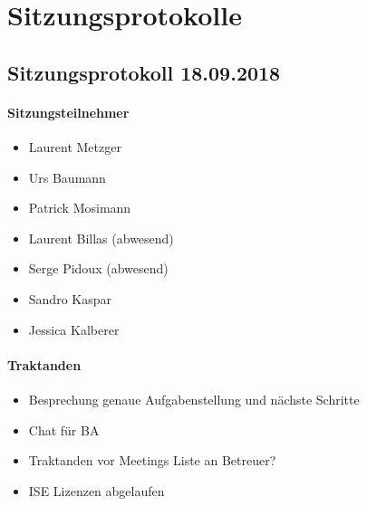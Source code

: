 \section{Sitzungsprotokolle}

\subsection{Sitzungsprotokoll 18.09.2018}

\paragraph{Sitzungsteilnehmer}
\begin{itemize}	
	\item Laurent Metzger 
	\item Urs Baumann 
	\item Patrick Mosimann
	\item Laurent Billas (abwesend)
	\item Serge Pidoux (abwesend)
	\item Sandro Kaspar
	\item Jessica Kalberer
\end{itemize}

\paragraph{Traktanden}
\begin{itemize}
	\item Besprechung genaue Aufgabenstellung und nächste Schritte
	\item Chat für BA
	\item Traktanden vor Meetings Liste an Betreuer? 
	\item ISE Lizenzen abgelaufen
\end{itemize}

